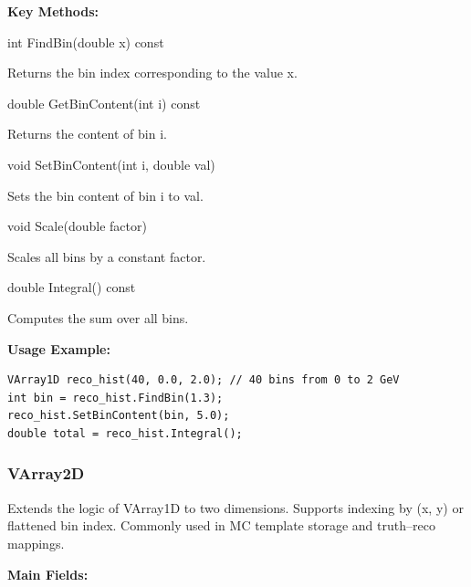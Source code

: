 \vspace{0.5em}
\noindent\textbf{Key Methods:}

\begin{description}[align=left]

  \item[] {\color{cadmiumred} int FindBin(double x) const}

  Returns the bin index corresponding to the value {\color{amber}x}.

  \item[] {\color{cadmiumred} double GetBinContent(int i) const}

  Returns the content of bin {\color{amber}i}.

  \item[] {\color{cadmiumred} void SetBinContent(int i, double val)}

  Sets the bin content of bin {\color{amber}i} to {\color{amber}val}.

  \item[] {\color{cadmiumred} void Scale(double factor)}

  Scales all bins by a constant factor.

  \item[] {\color{cadmiumred} double Integral() const}

  Computes the sum over all bins.

\end{description}

\vspace{0.5em}
\noindent\textbf{Usage Example:}

\begin{lstlisting}
VArray1D reco_hist(40, 0.0, 2.0); // 40 bins from 0 to 2 GeV
int bin = reco_hist.FindBin(1.3);
reco_hist.SetBinContent(bin, 5.0);
double total = reco_hist.Integral();
\end{lstlisting}

\vspace{1em}
\subsubsection*{\color{cadmiumgreen}\bf VArray2D}

Extends the logic of {\color{cadmiumgreen} VArray1D} to two dimensions.  
Supports indexing by {\color{amber}(x, y)} or flattened bin index.  
Commonly used in MC template storage and truth–reco mappings.

\vspace{0.5em}
\noindent\textbf{Main Fields:}

